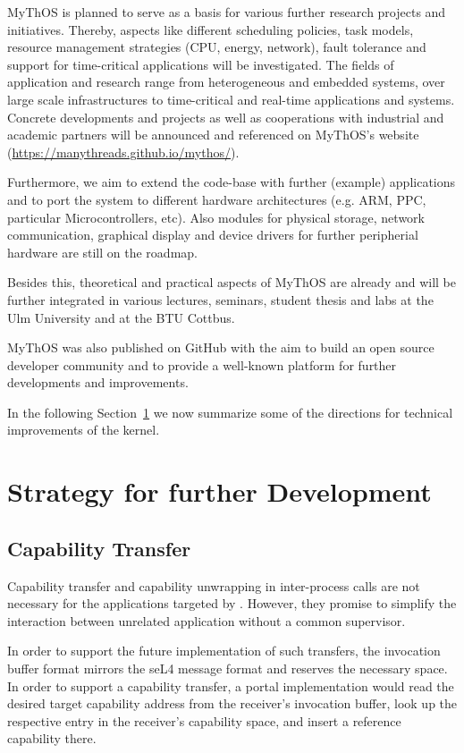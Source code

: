 MyThOS is planned to serve as a basis for various further research projects and
initiatives. Thereby, aspects like different scheduling policies, task models,
resource management strategies (CPU, energy, network), fault tolerance and
support for time-critical applications will be investigated. The fields of
application and research range from heterogeneous and embedded systems, over
large scale infrastructures to time-critical and real-time applications and
systems. Concrete developments and projects as well as cooperations with
industrial and academic partners will be announced and referenced on MyThOS's
website (\url{https://manythreads.github.io/mythos/}).

Furthermore, we aim to extend the code-base with further (example) applications
and to port the system to different hardware architectures (e.g. ARM, PPC,
particular Microcontrollers, etc). Also modules for physical storage, network
communication, graphical display and device drivers for further peripherial
hardware are still on the roadmap. 

Besides this, theoretical and practical aspects of MyThOS are already and will
be further integrated in various lectures, seminars, student thesis and labs at
the Ulm University and at the BTU Cottbus. 

MyThOS was also published on GitHub with the aim to build an open source
developer community and to provide a well-known platform for further
developments and improvements.

In the following Section~\ref{sec:extensions} we now summarize some of the
directions for technical improvements of the kernel.

\section{Strategy for further Development}
\label{sec:extensions}

\subsection{Capability Transfer}

Capability transfer and capability unwrapping in inter-process calls
are not necessary for the applications targeted by \mythos.  However,
they promise to simplify the interaction between unrelated application
without a common supervisor.

In order to support the future implementation of such transfers, the
invocation buffer format mirrors the seL4 message format and reserves
the necessary space.  In order to support a capability transfer, a
portal implementation would read the desired target capability address
from the receiver's invocation buffer, look up the respective entry in
the receiver's capability space, and insert a reference capability
there.

